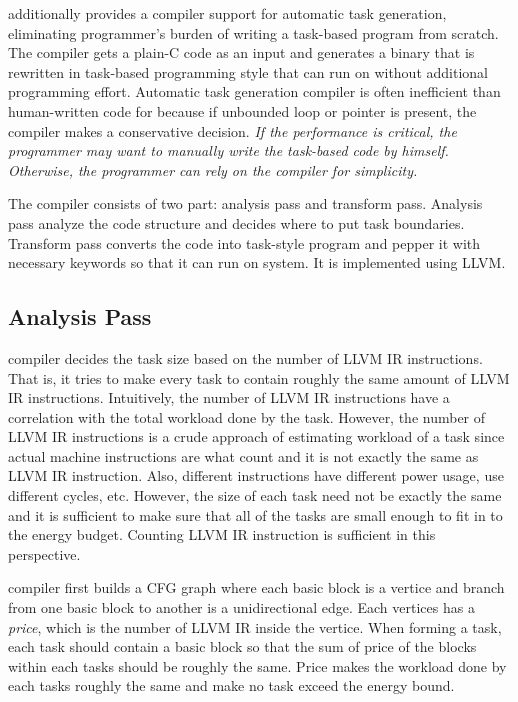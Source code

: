 \sys additionally provides a compiler support for automatic task generation, eliminating programmer's burden of writing a task-based program from scratch. The compiler gets a plain-C code as an input and generates a binary that is rewritten in task-based programming style that can run on \sys without additional programming effort. Automatic task generation compiler is often inefficient than human-written code for \sys because if unbounded loop or pointer is present, the compiler makes a conservative decision. \emph{If the performance is critical, the programmer may want to manually write the task-based code by himself. Otherwise, the programmer can rely on the compiler for simplicity.}

The compiler consists of two part: analysis pass and transform pass. Analysis pass analyze the code structure and decides where to put task boundaries. Transform pass converts the code into task-style program and pepper it with necessary \sys keywords so that it can run on \sys system. It is implemented using LLVM.

\subsection{Analysis Pass}
\label{sec:analysis}

\sys compiler decides the task size based on the number of LLVM IR instructions.
That is, it tries to make every task to contain roughly the same amount of LLVM IR
instructions. Intuitively, the number of LLVM IR instructions have a correlation with
the total workload done by the task. However, the number of LLVM IR instructions is 
a crude approach of estimating workload of a task since actual machine instructions are
what count and it is not exactly the same as LLVM IR instruction. Also, different instructions
have different power usage, use different cycles, etc. However, the size of each
task need not be exactly the same and it is sufficient to make sure that all of the
tasks are small enough to fit in to the energy budget. Counting LLVM IR instruction is sufficient
in this perspective.

\sys compiler first builds a CFG graph where each basic block is a vertice and branch
from one basic block to another is a unidirectional edge. Each vertices has a
{\em price}, which is the number of LLVM IR inside the vertice. 
When forming a task, each task should contain a basic block so that the sum of price of the 
blocks within each tasks should be roughly the same. Price makes the workload done by
each tasks roughly the same and make no task exceed the energy bound.

